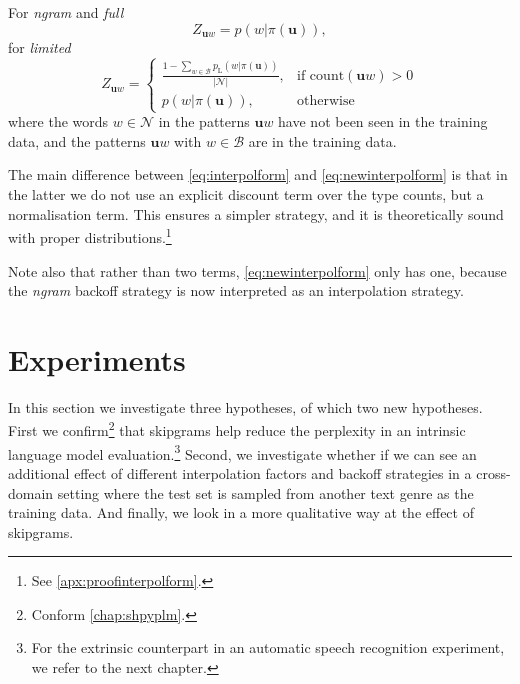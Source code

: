 For \textsl{ngram} and \textsl{full}
\begin{equation}
Z_{\mathbf{u}w} = p(w|\pi(\mathbf{u})),
\end{equation}
for \textsl{limited}
\begin{equation}
Z_{\mathbf{u}w} = \left.
\begin{cases}
\frac{1 - \sum_{w\in \mathcal{B}} p_{\mathrm{L}}(w|\pi(\mathbf{u}))}{|\mathcal{N}|}, & \text{if } \mathrm{count}(\mathbf{u}w) > 0 \\
p(w|\pi(\mathbf{u})), & \text{otherwise } 
\end{cases}
\right.
\end{equation}
where the words $w\in\mathcal{N}$ in the patterns $\mathbf{u}w$ have not been seen in the training data, and the patterns $\mathbf{u}w$ with $w\in\mathcal{B}$ are in the training data.

The main difference between \cref{eq:interpolform} and \cref{eq:newinterpolform} is that in the latter we do not use an explicit discount term over the type counts, but a normalisation term. This ensures a simpler strategy, and it is theoretically sound with proper distributions.\footnote{See \cref{apx:proofinterpolform}.} 

Note also that rather than two terms, \cref{eq:newinterpolform} only has one, because the \textsl{ngram} backoff strategy is now interpreted as an interpolation strategy.

\section{Experiments}
In this section we investigate three hypotheses, of which two new hypotheses. First we confirm\footnote{Conform \cref{chap:shpyplm}.} that skipgrams help reduce the perplexity in an intrinsic language model evaluation.\footnote{For the extrinsic counterpart in an automatic speech recognition experiment, we refer to the next chapter.} Second, we investigate whether if we can see an additional effect of different interpolation factors and backoff strategies in a cross-domain setting where the test set is sampled from another text genre as the training data. And finally, we look in a more qualitative way at the effect of skipgrams.


